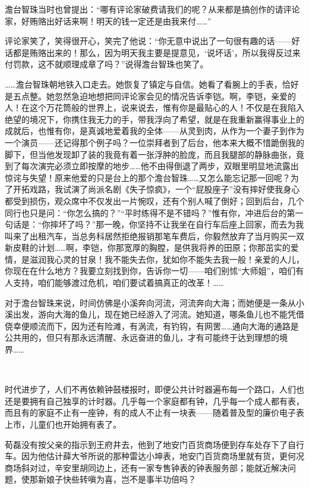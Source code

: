 \par 澹台智珠当时也曾提出：“哪有评论家破费请我们的呢？从来都是搞创作的请评论家，好贿赂出好话来啊！明天的钱一定还是由我来付……”
\par 评论家笑了，笑得很开心，笑完了他说：“你无意中说出了一句很有趣的话——好话都是贿赂出来的！那么，因为明天我主要是提意见，‘说坏话’，所以我得反过来付罚款，这不就顺理成章了吗？”说得澹台智珠也笑了。
\par ……澹台智珠朝地铁入口走去。她恢复了镇定与自信。她看了看腕上的手表，恰好是五点整。她忽然急迫地想把同评论家会见的情况告诉李铠。啊，李铠，亲爱的人！在这个万花筒般的世界上，说来说去，惟有你是最贴心的人！不仅是在我陷入绝望的境况下，你携住我无力的手，带我浮向了希望，就是在我重新赢得事业上的成就后，也惟有你，是真诚地爱着我的全体——从灵到肉，从作为一个妻子到作为一个演员——还记得那个例子吗？一位崇拜者到了后台，他本来大概不惜跪倒我的脚下，但当他发现卸了装的我竟有着一张浮肿的脸庞，而且我腿部的静脉曲张，竟到了每次演完必须立即按摩的地步……他不由得倒退了两步，双眼里明显地流露出惊诧与失望！原来他爱的只是台上的那个澹台智珠……又怎么能忘记那一回呢？为了开拓戏路，我试演了尚派名剧《失子惊疯》，一个“屁股座子”没有摔好使我身心都受到损伤，观众席中不仅发出一片惋叹，还有个别人喊了倒好；回到后台，几个同行也只是问：“你怎么搞的？”“平时练得不是不错吗？”惟有你，冲进后台的第一句话是：“你摔坏了吗？”那一晚，你坚持不让我坐在自行车后座上回家，而去为我叫来了出租汽车，当总务科居然拒绝报销那笔车费后，你毅然放弃了当月购买一双新皮鞋的计划……啊，李铠，你那宽厚的胸膛，是供我将养的田原；你那茁实的爱情，是滋润我心灵的甘泉！我不能失去你，犹如你不能失去我一般！亲爱的人儿，你现在在什么地方？我要立刻找到你，告诉你一切——咱们别怵“大师姐”，咱们有人支持，咱们能够渡过危机，咱们要试着搞真正的改革！……
\par 对于澹台智珠来说，时间仿佛是小溪奔向河流，河流奔向大海；而她便是一条从小溪出发，游向大海的鱼儿，现在她已经游入了河流。她知道，哪条鱼儿也不能凭借侥幸便顺流而下，因为还有险滩，有涡流，有钓钩，有网罟……通向大海的通路是公共用的，但只有那永远清醒、永远奋进的鱼儿，才有可能终于达到理想的境界……
\par  
\par 时代进步了，人们不再依赖钟鼓楼报时，即便公共计时器遍布每一个路口，人们也还是要拥有自己独享的计时器。几乎每一个家庭都有钟，几乎每一个成人都有表，而且有的家庭不止有一座钟，有的成人不止有一块表——随着普及型的廉价电子表上市，儿童们也开始拥有表了。
\par 荀磊没有按父亲的指示到王府井去，他到了地安门百货商场便到存车处存下了自行车。因为他估计薛大爷所说的那种雷达小坤表，地安门百货商场里就有货，更何况商场斜对过，辛安里胡同边上，还有一家专售钟表的钟表服务部；能就近解决问题，使那新娘子快些转嗔为喜，岂不是事半功倍吗？
